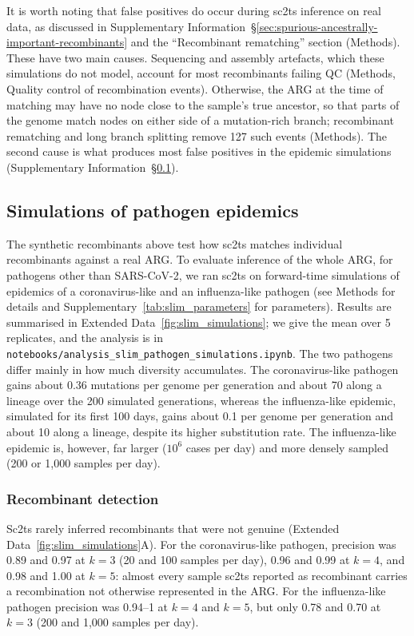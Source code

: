 \documentclass[12pt]{article}
\newcommand{\supref}[1]{Supplementary Information~\S\ref{#1}}
\newcommand{\edref}[1]{Extended Data~\ref{#1}}
\newcommand{\siref}[1]{Supplementary~\ref{#1}}
\begin{document}
It is worth noting that false positives do occur during sc2ts inference on
real data, as discussed in
\supref{sec:spurious-ancestrally-important-recombinants}
and the ``Recombinant rematching'' section (Methods).
These have two main causes.
Sequencing and assembly artefacts, which these simulations do not model,
account for most recombinants failing QC
(Methods, Quality control of recombination events).
Otherwise, the ARG at the time of matching may have no node close to
the sample's true ancestor, so that parts of the genome match nodes
on either side of a mutation-rich branch;
recombinant rematching and long branch splitting remove 127 such events (Methods).
The second cause is what produces most false positives in the epidemic simulations
(\supref{sec:slim_simulations}).

\subsection{Simulations of pathogen epidemics}\label{sec:slim_simulations}
The synthetic recombinants above test how sc2ts matches individual recombinants
against a real ARG. To evaluate inference of the whole ARG,
for pathogens other than SARS-CoV-2, we ran sc2ts on forward-time
simulations of epidemics of a coronavirus-like and an influenza-like pathogen
(see Methods for details and \siref{tab:slim_parameters} for parameters).
Results are summarised in \edref{fig:slim_simulations};
we give the mean over 5 replicates,
and the analysis is in \texttt{notebooks/analysis\_slim\_pathogen\_simulations.ipynb}.
The two pathogens differ mainly in how much diversity accumulates.
The coronavirus-like pathogen gains about 0.36 mutations per genome per generation
and about 70 along a lineage over the 200 simulated generations,
whereas the influenza-like epidemic, simulated for its first 100 days,
gains about 0.1 per genome per generation and about 10 along a lineage,
despite its higher substitution rate.
The influenza-like epidemic is, however, far larger ($10^6$ cases per day)
and more densely sampled (200 or 1,000 samples per day).

\subsubsection{Recombinant detection}
Sc2ts rarely inferred recombinants that were not genuine
(\edref{fig:slim_simulations}A).
For the coronavirus-like pathogen, precision was 0.89 and 0.97 at $k=3$
(20 and 100 samples per day), 0.96 and 0.99 at $k=4$, and 0.98 and 1.00 at $k=5$:
almost every sample sc2ts reported as recombinant
carries a recombination not otherwise represented in the ARG.
For the influenza-like pathogen precision was 0.94--1 at $k=4$ and $k=5$,
but only 0.78 and 0.70 at $k=3$ (200 and 1,000 samples per day).
\end{document}
